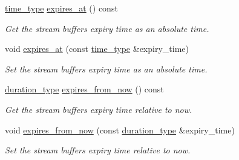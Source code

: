 \begin{DoxyCompactItemize}
\hyperlink{classasio_1_1basic__socket__streambuf_ac26395546c2d9decf0bcbc40b8f78adc}{time\+\_\+type} \hyperlink{classasio_1_1basic__socket__streambuf_a8e9940459f1640e1d18bae7d9adaae80}{expires\+\_\+at} () const 
\begin{DoxyCompactList}\small\item\em Get the stream buffer\textquotesingle{}s expiry time as an absolute time. \end{DoxyCompactList}\item 
void \hyperlink{classasio_1_1basic__socket__streambuf_aa123dfd841e9c6772a1c43f3b5b1ae5b}{expires\+\_\+at} (const \hyperlink{classasio_1_1basic__socket__streambuf_ac26395546c2d9decf0bcbc40b8f78adc}{time\+\_\+type} \&expiry\+\_\+time)
\begin{DoxyCompactList}\small\item\em Set the stream buffer\textquotesingle{}s expiry time as an absolute time. \end{DoxyCompactList}\item 
\hyperlink{classasio_1_1basic__socket__streambuf_a9205273677adfb1e713637662efa6e12}{duration\+\_\+type} \hyperlink{classasio_1_1basic__socket__streambuf_a4db03e0ed3fb810e83bf48c003ace27b}{expires\+\_\+from\+\_\+now} () const 
\begin{DoxyCompactList}\small\item\em Get the stream buffer\textquotesingle{}s expiry time relative to now. \end{DoxyCompactList}\item 
void \hyperlink{classasio_1_1basic__socket__streambuf_a44f4e6a5bd34905761c0ab1d41990b78}{expires\+\_\+from\+\_\+now} (const \hyperlink{classasio_1_1basic__socket__streambuf_a9205273677adfb1e713637662efa6e12}{duration\+\_\+type} \&expiry\+\_\+time)
\begin{DoxyCompactList}\small\item\em Set the stream buffer\textquotesingle{}s expiry time relative to now. \end{DoxyCompactList}\end{DoxyCompactItemize}
